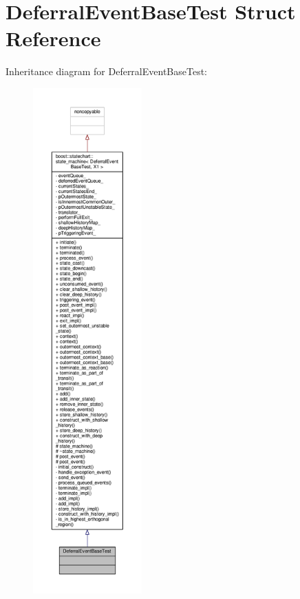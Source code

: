 \hypertarget{struct_deferral_event_base_test}{}\section{Deferral\+Event\+Base\+Test Struct Reference}
\label{struct_deferral_event_base_test}


Inheritance diagram for Deferral\+Event\+Base\+Test\+:
\nopagebreak
\begin{figure}[H]
\begin{center}
\leavevmode
\includegraphics[height=550pt]{struct_deferral_event_base_test__inherit__graph}
\end{center}
\end{figure}


